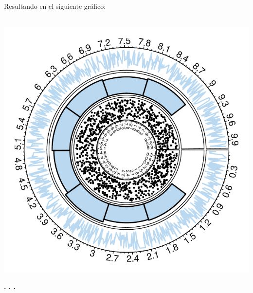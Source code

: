 \documentclass{article}\usepackage[]{graphicx}\usepackage[]{color}
\makeatletter
\def\maxwidth{ %
  \ifdim\Gin@nat@width>\linewidth
    \linewidth
  \else
    \Gin@nat@width
  \fi
}
\newenvironment{knitrout}{}{} %
\makeatother
\begin{document}
\clearpage
Resultando en el siguiente gr\'afico:~\\~\\
\begin{knitrout}
\color{fgcolor}

{\centering \includegraphics[width=\maxwidth]{figure/plot_ring_cir-1} 

}



\end{knitrout}
\begin{center}
\textbf{. . .}
\end{center}
\end{document}
